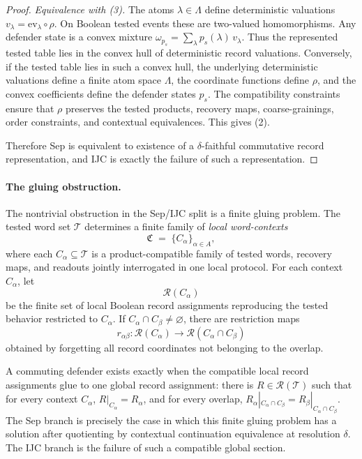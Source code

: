 \documentclass[11pt]{article}
\begin{document}
\begin{proof}
\emph{Equivalence with (3).}  The atoms $\lambda\in\Lambda$ define
deterministic valuations
$v_\lambda=\mathrm{ev}_\lambda\circ\rho$.  On Boolean tested events
these are two-valued homomorphisms.  Any defender state is a convex
mixture
$\omega_{p_s} = \sum_\lambda p_s(\lambda)\,v_\lambda$.  Thus the
represented tested table lies in the convex hull of deterministic
record valuations.  Conversely, if the tested table lies in such a
convex hull, the underlying deterministic valuations define a finite
atom space $\Lambda$, the coordinate functions define $\rho$, and the
convex coefficients define the defender states $p_s$.  The
compatibility constraints ensure that $\rho$ preserves the tested
products, recovery maps, coarse-grainings, order constraints, and
contextual equivalences.  This gives (2).

Therefore Sep is equivalent to existence of a $\delta$-faithful
commutative record representation, and IJC is exactly the failure of
such a representation.
\end{proof}

\paragraph{The gluing obstruction.}
The nontrivial obstruction in the Sep/IJC split is a finite gluing
problem.  The tested word set $\mathcal T$ determines a finite family
of \emph{local word-contexts}
\[
    \mathfrak C \;=\; \{C_\alpha\}_{\alpha\in A},
\]
where each $C_\alpha\subseteq\mathcal T$ is a product-compatible
family of tested words, recovery maps, and readouts jointly
interrogated in one local protocol.  For each context $C_\alpha$, let
\[
    \mathcal R(C_\alpha)
\]
be the finite set of local Boolean record assignments reproducing the
tested behavior restricted to $C_\alpha$.  If
$C_\alpha\cap C_\beta\neq\varnothing$, there are restriction maps
\[
    r_{\alpha\beta}:\mathcal R(C_\alpha)\to
    \mathcal R(C_\alpha\cap C_\beta)
\]
obtained by forgetting all record coordinates not belonging to the
overlap.

A commuting defender exists exactly when the compatible local record
assignments glue to one global record assignment: there is
$R\in\mathcal R(\mathcal T)$ such that for every context $C_\alpha$,
$R|_{C_\alpha}=R_\alpha$, and for every overlap,
$R_\alpha|_{C_\alpha\cap C_\beta} = R_\beta|_{C_\alpha\cap C_\beta}$.
The Sep branch is precisely the case in which this finite gluing
problem has a solution after quotienting by contextual continuation
equivalence at resolution $\delta$.  The IJC branch is the failure of
such a compatible global section.
\end{document}
